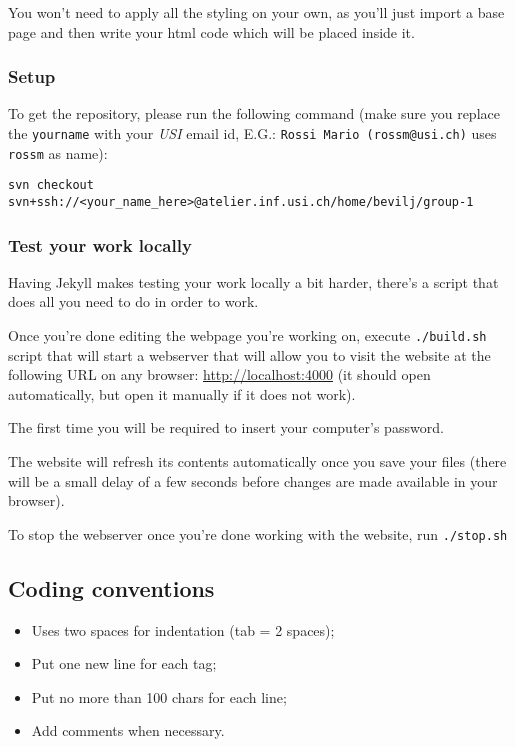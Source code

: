 \documentclass[hidelinks,12pt,a4paper,numbers=enddot]{scrartcl}
\begin{document}
You won't need to apply all the styling on your own, as you'll just
import a base page and then write your html code which will be placed inside it.

\subsubsection{Setup}\label{setup}

To get the repository, please run the following command (make sure you
replace the \texttt{yourname} with your \emph{USI} email id,
E.G.: \texttt{Rossi\ Mario\ (rossm@usi.ch)} uses
\texttt{rossm} as name):

\begin{verbatim}
svn checkout svn+ssh://<your_name_here>@atelier.inf.usi.ch/home/bevilj/group-1
\end{verbatim}

\subsubsection{Test your work locally}\label{test-your-work-locally}

Having Jekyll makes testing your work locally a bit harder, there's a
script that does all you need to do in order to work.

Once you're done editing the webpage you're working on, execute
\texttt{./build.sh} script that will start a webserver that will allow you
to visit the website at the following URL on any browser:
\url{http://localhost:4000} (it should open automatically, but open it
manually if it does not work).

The first time you will be required to insert your computer's password.

The website will refresh its contents automatically once you save your
files (there will be a small delay of a few seconds before changes are
made available in your browser).

To stop the webserver once you're done working with the website,
run \texttt{./stop.sh}

\subsection{Coding conventions}\label{coding-conventions}

\begin{itemize}
\item
  Uses two spaces for indentation (tab = 2 spaces);
\item
  Put one new line for each tag;
\item
  Put no more than 100 chars for each line;
\item
  Add comments when necessary.
\end{itemize}
\end{document}
